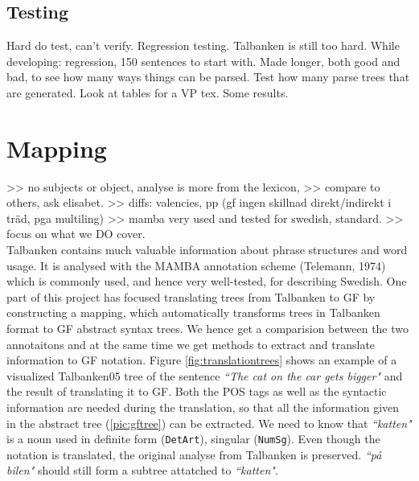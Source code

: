 \documentclass{report}
\begin{document}
\section{Testing}
Hard do test, can't verify. Regression testing. Talbanken is still too hard.
While developing: regression, 150 sentences to start with. Made longer, both good and bad,
to see how many ways things can be parsed.
Test how many parse trees that are generated.
Look at tables for a VP tex.
Some results.


\chapter{Mapping}
\label{sec:Mapping}
>> no subjects or object, analyse is more from the lexicon,
>> compare to others, ask elisabet.
>> diffs: valencies, pp (gf ingen skillnad direkt/indirekt i träd, pga multiling)
>> mamba very used and tested for swedish, standard.
>> focus on what we DO cover.\\
Talbanken contains much valuable information about phrase structures and word 
usage. It is analysed with the MAMBA annotation scheme (Telemann, 1974) which is 
commonly used, and hence very well-tested, for describing Swedish.
One part of this project has focused translating trees from Talbanken to GF
by constructing a mapping, which 
automatically transforms trees in Talbanken format to GF abstract syntax trees.
We hence get a comparision between the two annotaitons and at the same time
we get methods to extract and translate information to GF notation. 
Figure \ref{fig:translationtrees} shows an example of a visualized Talbanken05 tree
of the sentence \emph{``The cat on the car gets bigger"} and the result of translating it to GF.
Both the POS tags as well as the syntactic information are needed
during the translation, so that all the information given in the abstract tree
(\ref{pic:gftree}) can be extracted. We need to know that \emph{``katten"} is a noun
used in definite form (\verb-DetArt-), singular (\verb-NumSg-). Even though the
notation is translated, the original analyse from Talbanken
is preserved.
\emph{``på bilen"} should still form a subtree attatched to \emph{``katten"}.
\end{document}
